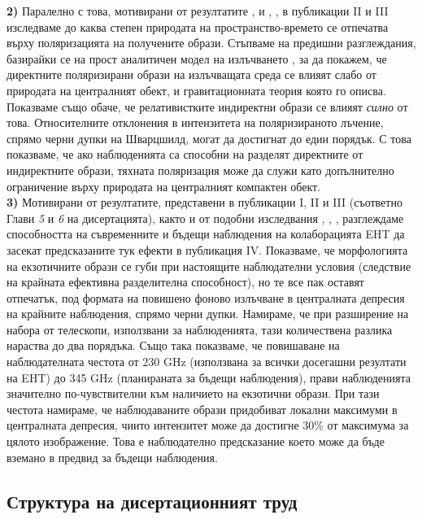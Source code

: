 \documentclass[12pt]{article}
\numberwithin{equation}{section}
\numberwithin{figure}{section}
\begin{document}
	\textbf{2)} Паралелно с това, мотивирани от резултатите \cite{EHT_M87_VII}, \cite{EHT_M87_VIII} и \cite{EHT_SGR_VII}, \cite{EHT_SGR_VIII}, в публикации II и III изследваме до каква степен природата на пространство-времето се отпечатва върху поляризацията на получените образи. Стъпваме на предишни разглеждания, базирайки се на прост аналитичен модел на излъчването \cite{Narayan2021} \cite{Gelles2021}, за да покажем, че директните поляризирани образи на излъчващата среда се влияят слабо от природата на централният обект, и гравитационната теория която го описва. Показваме също обаче, че релативистките индиректни образи се влияят \emph{силно} от това. Относителните отклонения в интензитета на поляризираното лъчение, спрямо черни дупки на Шварцшилд, могат да достигнат до един порядък. С това показваме, че ако наблюденията са способни на разделят директните от индиректните образи, тяхната поляризация може да служи като допълнително ограничение върху природата на централният компактен обект.\\
	
	\textbf{3)} Мотивирани от резултатите, представени в публикации I, II и III (съответно Глави \emph{5} и \emph{6} на дисертацията), както и от подобни изследвания \cite{Eichhorn2022}, \cite{Qin2021}, \cite{Geometric_Modeling}, разглеждаме способността на съвременните и бъдещи наблюдения на колаборацията EHT да засекат предсказаните тук ефекти в публикация IV. Показваме, че морфологията на екзотичните образи се губи при настоящите наблюдателни условия (следствие на крайната ефективна разделителна способност), но те все пак оставят отпечатък, под формата на повишено фоново излъчване в централната депресия на крайните наблюдения, спрямо черни дупки. Намираме, че при разширение на набора от телескопи, използвани за наблюденията, тази количествена разлика нараства до два порядъка. Също така показваме, че повишаване на наблюдателната честота от $230$ GHz (използвана за всички досегашни резултати на EHT) до 345 GHz (планираната за бъдещи наблюдения), прави наблюденията значително по-чувствителни към наличието на екзотични образи. При тази честота намираме, че наблюдаваните образи придобиват локални максимуми в централната депресия, чиито интензитет може да достигне 30\% от максимума за цялото изображение. Това е наблюдателно предсказание което може да бъде вземано в предвид за бъдещи наблюдения.
	
	\subsection{Структура на дисертационният труд}
	
\end{document}
